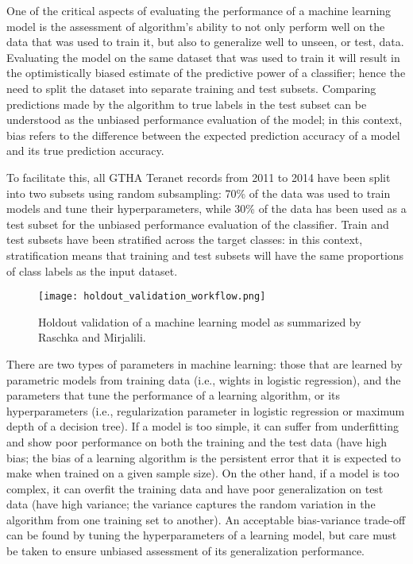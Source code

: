 One of the critical aspects of evaluating the performance of a machine learning model is the assessment of algorithm's ability to not only perform well on the data that was used to train it, but also to generalize well to unseen, or test, data.
Evaluating the model on the same dataset that was used to train it will result in the optimistically biased estimate of the predictive power of a classifier;
hence the need to split the dataset into separate training and test subsets.
Comparing predictions made by the algorithm to true labels in the test subset can be understood as the unbiased performance evaluation of the model\cite{RaschkaMirjalili2017};
in this context, bias refers to the difference between the expected prediction accuracy of a model and its true prediction accuracy\cite{Raschka2018}.

To facilitate this, all GTHA Teranet records from 2011 to 2014 have been split into two subsets using random subsampling: 70\% of the data was used to train models and tune their hyperparameters, while 30\% of the data has been used as a test subset for the unbiased performance evaluation of the classifier.
Train and test subsets have been stratified across the target classes:
in this context, stratification means that training and test subsets will have the same proportions of class labels as the input dataset.

\begin{figure}[hbt!]
    \centering
    \texttt{[image: holdout\_validation\_workflow.png]}
    \caption{Holdout validation of a machine learning model as summarized by Raschka and Mirjalili\cite{RaschkaMirjalili2017}.}
    \label{fig:holdout_validation_workflow}
\end{figure}

There are two types of parameters in machine learning: those that are learned by parametric models from training data (i.e., wights in logistic regression), and the parameters that tune the performance of a learning algorithm, or its hyperparameters (i.e., regularization parameter in logistic regression or maximum depth of a decision tree).
If a model is too simple, it can suffer from underfitting and show poor performance on both the training and the test data (have high bias;
the bias of a learning algorithm is the persistent error that it is expected to make when trained on a given sample size\cite{Dietterich1995}).
On the other hand, if a model is too complex, it can overfit the training data and have poor generalization on test data (have high variance;
the variance captures the random variation in the algorithm from one training set to another\cite{Dietterich1995}).
An acceptable bias-variance trade-off can be found by tuning the hyperparameters of a learning model, but care must be taken to ensure unbiased assessment of its generalization performance.

